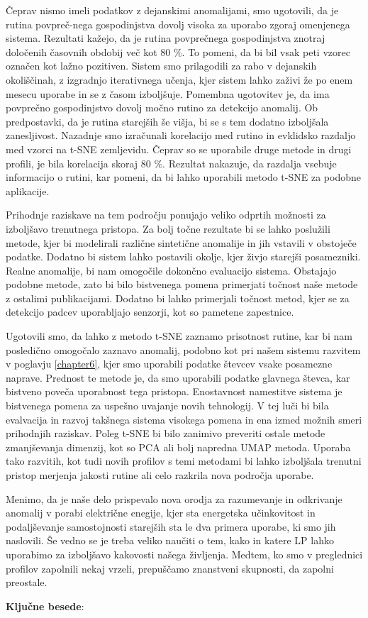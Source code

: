 \begin{sloabstract}
Čeprav nismo imeli podatkov z dejanskimi anomalijami, smo ugotovili, da je rutina povpreč-nega gospodinjstva dovolj visoka za uporabo zgoraj omenjenega sistema. Rezultati kažejo, da je rutina povprečnega gospodinjstva znotraj določenih časovnih obdobij več kot 80 \%. To pomeni, da bi bil vsak peti vzorec označen kot lažno pozitiven. Sistem smo prilagodili za rabo v dejanskih okoliščinah, z izgradnjo iterativnega učenja, kjer sistem lahko zaživi že po enem mesecu uporabe in se z časom izboljšuje. Pomembna ugotovitev je, da ima povprečno gospodinjstvo dovolj močno rutino za detekcijo anomalij. Ob predpostavki, da je rutina starejših še višja, bi se s tem dodatno izboljšala zanesljivost. Nazadnje smo izračunali korelacijo med rutino in evklidsko razdaljo med vzorci na t-SNE zemljevidu. Čeprav so se uporabile druge metode in drugi profili, je bila korelacija skoraj 80 \%. Rezultat nakazuje, da razdalja vsebuje informacijo o rutini, kar pomeni, da bi lahko uporabili metodo t-SNE za podobne aplikacije.  

Prihodnje raziskave na tem področju ponujajo veliko odprtih možnosti za izboljšavo trenutnega pristopa. Za bolj točne rezultate bi se lahko poslužili metode, kjer bi modelirali različne sintetične anomalije in jih vstavili v obstoječe podatke. Dodatno bi sistem lahko postavili okolje, kjer živjo starejši posamezniki. Realne anomalije, bi nam omogočile dokončno evaluacijo sistema. Obstajajo podobne metode, zato bi bilo bistvenega pomena primerjati točnost naše metode z ostalimi publikacijami. Dodatno bi lahko primerjali točnost metod, kjer se za detekcijo padcev uporabljajo senzorji, kot so pametene zapestnice.  

Ugotovili smo, da lahko z metodo t-SNE zaznamo prisotnost rutine, kar bi nam posledično omogočalo zaznavo anomalij, podobno kot pri našem sistemu razvitem v poglavju \ref{chapter6}, kjer smo uporabili podatke števcev vsake posamezne naprave. Prednost te metode je, da smo uporabili podatke glavnega števca, kar bistveno poveča uporabnost tega pristopa. Enostavnost namestitve sistema je bistvenega pomena za uspešno uvajanje novih tehnologij. V tej luči bi bila evalvacija in razvoj takšnega sistema visokega pomena in ena izmed možnih smeri prihodnjih raziskav. Poleg t-SNE bi bilo zanimivo preveriti ostale metode zmanjševanja dimenzij, kot so PCA ali bolj napredna UMAP metoda. Uporaba tako razvitih, kot tudi novih profilov s temi metodami bi lahko izboljšala trenutni pristop merjenja jakosti rutine ali celo razkrila nova področja uporabe.  

Menimo, da je naše delo prispevalo nova orodja za razumevanje in odkrivanje anomalij v porabi električne enegije, kjer sta energetska učinkovitost in podaljševanje samostojnosti starejših sta le dva primera uporabe, ki smo jih naslovili. Še vedno se je treba veliko naučiti o tem, kako in katere LP lahko uporabimo za izboljšavo kakovosti našega življenja. Medtem, ko smo v preglednici profilov zapolnili nekaj vrzeli, prepuščamo znanstveni skupnosti, da zapolni preostale.  


\par\textbf{Ključne besede}: \slokeywordnames 
  
  \end{sloabstract}